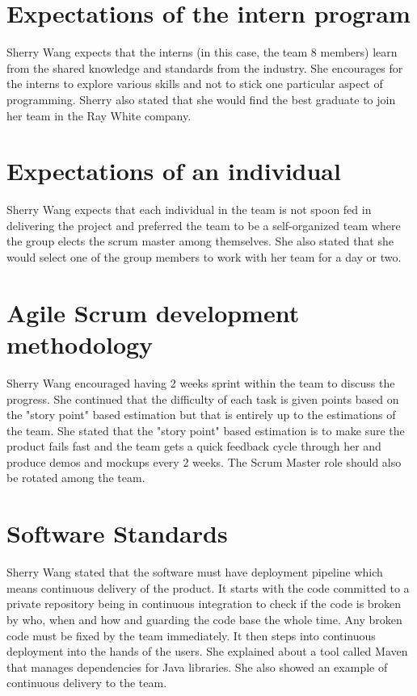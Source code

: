 \documentclass[12pt]{article}
\begin{document}
\section*{Expectations of the intern program}
Sherry Wang expects that the interns (in this case, the team 8 members) learn from the shared knowledge and standards from the industry. She encourages for the interns to explore various skills and not to stick one particular aspect of programming. Sherry also stated that she would find the best graduate to join her team in the Ray White company.

\section*{Expectations of an individual}
Sherry Wang expects that each individual in the team is not spoon fed in delivering the project and preferred the team to be a self-organized team where the group elects the scrum master among themselves. She also stated that she would select one of the group members to work with her team for a day or two.

\section*{Agile Scrum development methodology}
Sherry Wang encouraged having 2 weeks sprint within the team to discuss the progress. She continued that the difficulty of each task is given points based on the "story point" based estimation but that is entirely up to the estimations of the team. She stated that the "story point" based estimation is to make sure the product fails fast and the team gets a quick feedback cycle through her and produce demos and mockups every 2 weeks. The Scrum Master role should also be rotated among the team.

\section*{Software Standards}
Sherry Wang stated that the software must have deployment pipeline which means continuous delivery of the product. It starts with the code committed  to a private repository being in continuous integration to check if the code is broken by who, when and how and guarding the code base the whole time. Any broken code must be fixed by the team immediately. It then steps into continuous deployment into the hands of the users. She explained about a tool called Maven that manages dependencies for Java libraries. She also showed an example of continuous delivery to the team.
\end{document}
